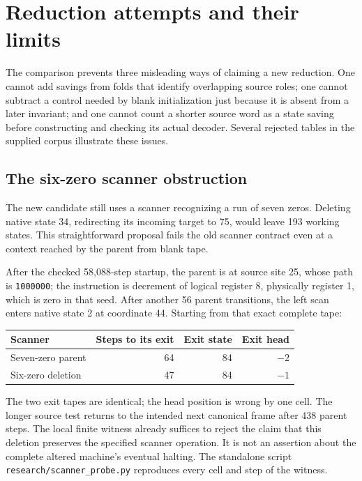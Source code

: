 \documentclass[11pt,letterpaper]{article}
\newcommand{\file}[1]{\nolinkurl{#1}}
\begin{document}


\section{Reduction attempts and their limits}
\label{sec:research}

The comparison prevents three misleading ways of claiming a new reduction.
One cannot add savings from folds that identify overlapping source roles;
one cannot subtract a control needed by blank initialization just because
it is absent from a later invariant; and one cannot count a shorter source
word as a state saving before constructing and checking its actual decoder.
Several rejected tables in the supplied corpus illustrate these issues.

\subsection{The six-zero scanner obstruction}

The new candidate still uses a scanner recognizing a run of seven zeros.
Deleting native state 34, redirecting its incoming target to 75, would leave
193 working states. This straightforward proposal fails the old scanner
contract even at a context reached by the parent from blank tape.

After the checked 58,088-step startup, the parent is at source site 25,
whose path is \texttt{1000000}; the instruction is decrement of logical
register 8, physically register 1, which is zero in that seed. After another
56 parent transitions, the left scan enters native state 2 at coordinate 44.
Starting from that exact complete tape:
\begin{center}
\begin{tabular}{lrrr}\toprule
Scanner & Steps to its exit & Exit state & Exit head\\\midrule
Seven-zero parent & 64 & 84 & $-2$\\
Six-zero deletion & 47 & 84 & $-1$\\\bottomrule
\end{tabular}
\end{center}
The two exit tapes are identical; the head position is wrong by one cell.
The longer source test returns to the intended next canonical frame after
438 parent steps. The local finite witness already suffices to reject the
claim that this deletion preserves the specified scanner operation. It is
not an assertion about the complete altered machine's eventual halting.
The standalone script \file{research/scanner_probe.py} reproduces every cell
and step of the witness.
\end{document}
